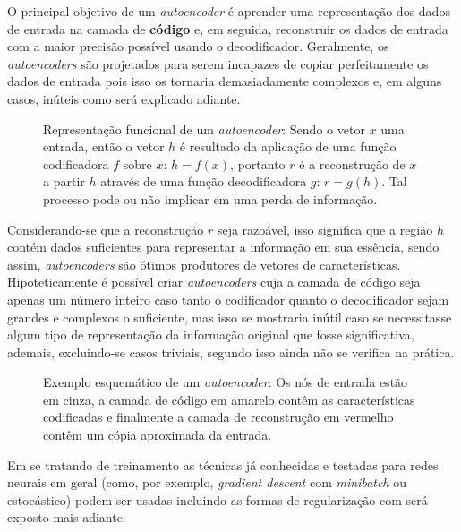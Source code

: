 			\par O principal objetivo de um \textit{autoencoder} é aprender uma representação dos dados de entrada na camada de \textbf{código} e, em seguida, reconstruir os dados de entrada com a maior precisão possível usando o decodificador. Geralmente, os \textit{autoencoders} são projetados para serem incapazes de copiar perfeitamente os dados de entrada pois isso os tornaria demasiadamente complexos e, em alguns casos, inúteis como será explicado adiante.

			\begin{figure}[h]
				\centering
				\caption[Representação funcional de um autoencoder]{Representação funcional de um \textit{autoencoder}: Sendo o vetor $x$ uma entrada, então o vetor $h$ é resultado da aplicação de uma função codificadora $f$ sobre $x$: $h = f(x)$, portanto $r$ é a reconstrução de $x$ a partir $h$ através de uma função decodificadora $g$: $r = g(h)$. Tal processo pode ou não implicar em uma perda de informação.}
				
				\label{fig:autoencoder}
			\end{figure}
		
			\par Considerando-se que a reconstrução $r$ seja razoável, isso significa que a região $h$  contém dados suficientes para representar a informação em sua essência, sendo assim, \textit{autoencoders} são ótimos produtores de vetores de características. Hipoteticamente é possível criar \textit{autoencoders} cuja a camada de código seja apenas um número inteiro caso tanto o codificador quanto o decodificador sejam grandes e complexos o suficiente, mas isso se mostraria inútil caso se necessitasse algum tipo de representação da informação original que fosse significativa, ademais, excluindo-se casos triviais, segundo \cite{Goodfellow-et-al-2016} isso ainda não se verifica na prática.

			\begin{figure}[h]
				\centering
				\caption[Exemplo esquemático de um autoencoder]{Exemplo esquemático de um \textit{autoencoder}: Os nós de entrada estão em cinza, a camada de código em amarelo contêm as características codificadas e finalmente a camada de reconstrução em vermelho contêm um cópia aproximada da entrada.}
				
				\label{fig:autoencoder2}
			\end{figure}

			\par Em se tratando de treinamento as técnicas já conhecidas e testadas para redes neurais em geral (como, por exemplo, \textit{gradient descent} com \textit{minibatch} ou estocástico) podem ser usadas  \cite{Goodfellow-et-al-2016} incluindo as formas de regularização com será exposto mais adiante.
			
